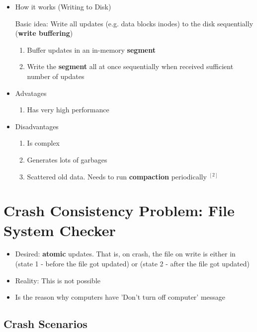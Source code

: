 \documentclass[12pt]{article}
\begin{document}
\begin{itemize}
    \item How it works (Writing to Disk)

    \bigskip

    Basic idea: Write all updates (e.g. data blocks inodes) to the
    disk sequentially (\textbf{write buffering})

    \bigskip

    \begin{enumerate}[1.]
        \item Buffer updates in an in-memory \textbf{segment}
        \item Write the \textbf{segment} all at once sequentially when received sufficient number of updates
    \end{enumerate}

    \item Advatages

    \begin{enumerate}[1.]
        \item Has very high performance
    \end{enumerate}

    \item Disadvantages

    \begin{enumerate}[1.]
        \item Is complex
        \item Generates lots of garbages
        \item Scattered old data. Needs to run \textbf{compaction} periodically $^{[2]}$
    \end{enumerate}
\end{itemize}

\section{Crash Consistency Problem: File System Checker}

\begin{itemize}
    \item Desired: \textbf{atomic} updates. That is, on crash,
    the file on write is either in (state 1 - before the file got updated)
    or (state 2 - after the file got updated)
    \item Reality: This is not possible
    \item Is the reason why computers have 'Don't turn off computer' message
\end{itemize}

\subsection{Crash Scenarios}
\end{document}
